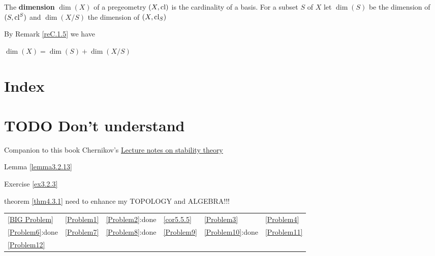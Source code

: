 \documentclass[11pt]{article}
\begin{document}
\begin{definition}[]
The \textbf{dimension} \(\dim(X)\) of a pregeometry \((X,\operatorname{\text{cl}})\) is the cardinality of a basis. For a
subset \(S\) of \(X\) let \(\dim(S)\) be the dimension of \((S,\operatorname{\text{cl}}^S)\) and \(\dim(X/S)\) the
dimension of \((X,\operatorname{\text{cl}}_S)\)
\end{definition}

By Remark \ref{reC.1.5} we have
\begin{lemma}[]
\label{lemmaC.1.8}
\(\dim(X)=\dim(S)+\dim(X/S)\)
\end{lemma}


\section{Index}
\label{sec:org5c5a62e}
\renewcommand{\indexname}{}
\printindex
\section{{\bfseries\sffamily TODO} Don't understand}
\label{sec:orga36fb59}
Companion to this book
Chernikov's \href{https://www.math.ucla.edu/\~chernikov/teaching/StabilityTheory285D/StabilityNotes.pdf}{Lecture notes on stability theory}

Lemma \ref{lemma3.2.13}

Exercise \ref{ex3.2.3}

theorem \ref{thm4.3.1} need to enhance my TOPOLOGY and ALGEBRA!!!

\begin{center}
\begin{tabular}{llllll}
\hline
\ref{BIG Problem} & \ref{Problem1} & \ref{Problem2}:done & \ref{cor5.5.5} & \ref{Problem3} & \ref{Problem4}\\
\ref{Problem6}:done & \ref{Problem7} & \ref{Problem8}:done & \ref{Problem9} & \ref{Problem10}:done & \ref{Problem11}\\
\ref{Problem12} &  &  &  &  & \\
\end{tabular}
\end{center}
\end{document}
